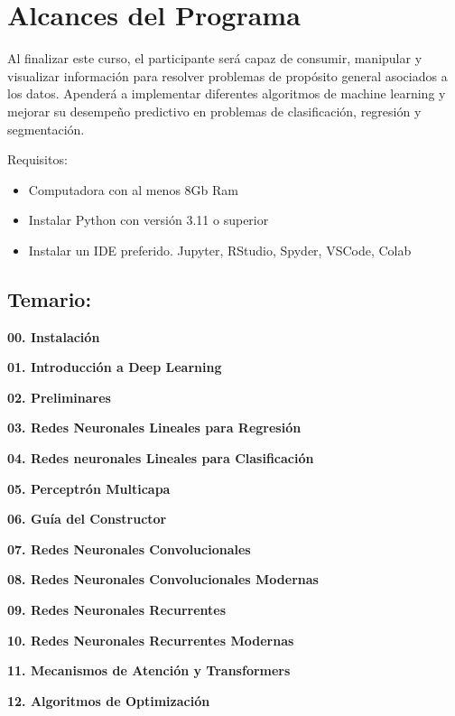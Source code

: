 \documentclass[
]{book}
\providecommand{\tightlist}{%
  \setlength{\itemsep}{0pt}\setlength{\parskip}{0pt}}
\begin{document}
\hypertarget{alcances-del-programa}{%
\section*{Alcances del Programa}\label{alcances-del-programa}}

Al finalizar este curso, el participante será capaz de consumir, manipular y visualizar información para resolver problemas de propósito general asociados a los datos. Apenderá a implementar diferentes algoritmos de machine learning y mejorar su desempeño predictivo en problemas de clasificación, regresión y segmentación.

Requisitos:

\begin{itemize}
\tightlist
\item
  Computadora con al menos 8Gb Ram
\item
  Instalar Python con versión 3.11 o superior
\item
  Instalar un IDE preferido. Jupyter, RStudio, Spyder, VSCode, Colab
\end{itemize}

\hypertarget{temario}{%
\subsection*{Temario:}\label{temario}}

\textbf{00. Instalación}

\textbf{01. Introducción a Deep Learning}

\textbf{02. Preliminares}

\textbf{03. Redes Neuronales Lineales para Regresión}

\textbf{04. Redes neuronales Lineales para Clasificación}

\textbf{05. Perceptrón Multicapa}

\textbf{06. Guía del Constructor}

\textbf{07. Redes Neuronales Convolucionales}

\textbf{08. Redes Neuronales Convolucionales Modernas}

\textbf{09. Redes Neuronales Recurrentes}

\textbf{10. Redes Neuronales Recurrentes Modernas}

\textbf{11. Mecanismos de Atención y Transformers}

\textbf{12. Algoritmos de Optimización}
\end{document}
